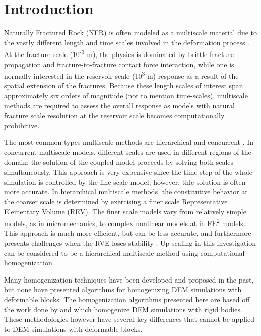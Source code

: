 \section{Introduction}
Naturally Fractured Rock (NFR) is often modeled as a multiscale material due to the vastly different length and time scales involved in the deformation process \citep{zhou_flow_2003}. At the fracture scale (10\textsuperscript{-3} m), the physics is dominated by brittle fracture propagation and fracture-to-fracture contact force interaction, while one is normally interested in the reservoir scale (10\textsuperscript{3} m) response as a result of the spatial extension of the fractures. Because these length scales of interest span approximately six orders of magnitude (not to mention time-scales), multiscale methods are required to assess the overall response as models with natural fracture scale resolution at the reservoir scale becomes computationally prohibitive.

The most common types multiscale methods are hierarchical and concurrent \citep{Gracie_2011}. In concurrent multiscale models, different scales are used in different regions of the domain; the solution of the coupled model proceeds by solving both scales simultaneously. This approach is very expensive since the time step of the whole simulation is controlled by the fine-scale model; however, thle solution is often more accurate.  In hierarchical multiscale methods, the constitutive behavior at the coarser scale is determined by exercising a finer scale Representative Elementary Volume (REV). The finer scale models vary from relatively simple models, as in micromechanics, to complex nonlinear models at in FE\textsuperscript{2} models\citep{Feyel_2003}. This approach is much more efficient, but can be less accurate, and furthermore  presents challenges when the RVE loses stability \citep{Belytschko_2008}. Up-scaling in this investigation can be considered to be a hierarchical multiscale method using computational homogenization. 

Many homogenization techniques have been developed and proposed in the past, but none have presented algorithms for homogenizing DEM simulations with deformable blocks. The homogenization algorithms presented here are based off the work done by \citet{daddetta_particle_2004} and \citet{wellmann_homogenization_2008} which homogenize DEM simulations with rigid bodies. These methodologies however have several key differences that cannot be applied to DEM simulations with deformable blocks.

